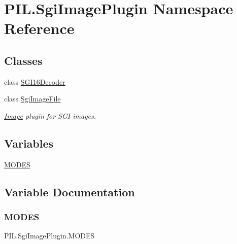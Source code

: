 \hypertarget{namespacePIL_1_1SgiImagePlugin}{}\section{P\+I\+L.\+Sgi\+Image\+Plugin Namespace Reference}
\label{namespacePIL_1_1SgiImagePlugin}
\subsection*{Classes}
\begin{DoxyCompactItemize}
\item 
class \hyperlink{classPIL_1_1SgiImagePlugin_1_1SGI16Decoder}{S\+G\+I16\+Decoder}
\item 
class \hyperlink{classPIL_1_1SgiImagePlugin_1_1SgiImageFile}{Sgi\+Image\+File}
\begin{DoxyCompactList}\small\item\em \hyperlink{namespacePIL_1_1Image}{Image} plugin for S\+GI images. \end{DoxyCompactList}\end{DoxyCompactItemize}
\subsection*{Variables}
\begin{DoxyCompactItemize}
\item 
\hyperlink{namespacePIL_1_1SgiImagePlugin_aada0fb4bb5e2f4fbdbdbc040683199c9}{M\+O\+D\+ES}
\end{DoxyCompactItemize}


\subsection{Variable Documentation}
\mbox{\label{namespacePIL_1_1SgiImagePlugin_aada0fb4bb5e2f4fbdbdbc040683199c9}} 
\subsubsection{\texorpdfstring{M\+O\+D\+ES}{MODES}}
{\footnotesize\ttfamily P\+I\+L.\+Sgi\+Image\+Plugin.\+M\+O\+D\+ES}

